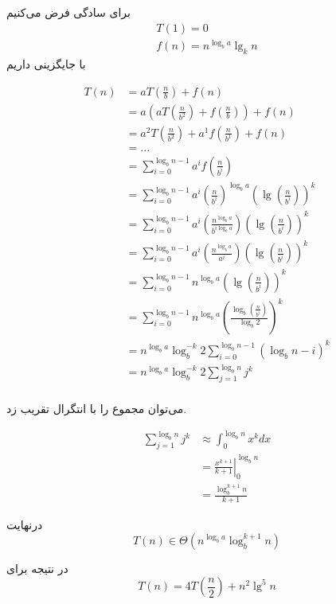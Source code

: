 \documentclass{article}
\begin{document}
	برای سادگی فرض می‌کنیم
	\begin{gather*}
		T(1) = 0 \\
		f(n) = n^{\log_b a} \lg_k n
	\end{gather*}
	با جایگزینی داریم

	\begin{align*}
		T(n) &= aT(\frac{n}{b}) + f(n) \\
		&= a(aT(\frac{n}{b^2}) + f(\frac{n}{b})) + f(n) \\
		&= a^2 T(\frac{n}{b^2}) + a^1f(\frac{n}{b^1}) + f(n) \\
		&= ... \\
		&= \sum_{i=0}^{\log_b n - 1} a^i f(\frac{n}{b^i}) \\
		&= \sum_{i=0}^{\log_b n - 1} a^i \left(\frac{n}{b^i}\right)^{\log_b a} \left(\lg \left(\frac{n}{b^i}\right)\right)^k \\
		&= \sum_{i=0}^{\log_b n - 1} a^i \left(\frac{n^{\log_b a}}{b^{i{\log_b a}}}\right) \left(\lg \left(\frac{n}{b^i}\right)\right)^k \\
		&= \sum_{i=0}^{\log_b n - 1} a^i \left(\frac{n^{\log_b a}}{a^i}\right) \left(\lg \left(\frac{n}{b^i}\right)\right)^k \\
		&= \sum_{i=0}^{\log_b n - 1}  n^{\log_b a} \left(\lg \left(\frac{n}{b^i}\right)\right)^k \\
		&= \sum_{i=0}^{\log_b n - 1}  n^{\log_b a} \left(\frac{\log_b \left(\frac{n}{b^i}\right)}{\log_b 2}\right)^k \\
		&= n^{\log_b a} \log_b^{-k} 2 \sum_{i=0}^{\log_b n - 1} \left(\log_b n - i\right)^k \\
		&= n^{\log_b a} \log_b^{-k} 2 \sum_{j=1}^{\log_b n} j^k \\
	\end{align*}

		می‌توان مجموع را با انتگرال تقریب زد.

	\begin{align*}
		\sum_{j=1}^{\log_b n} j^k
		&\approx \int_{0}^{\log_b n} x^k dx\\
		&= \left.\frac{x^{k+1}}{k+1}\right|^{\log_b n}_{0} \\
		&= \frac{\log^{k+1}_b n}{k+1}
	\end{align*}

	درنهایت
	\begin{equation*}
		T(n) \in \Theta(n^{\log_b a} \log_b^{k+1} n)
	\end{equation*}

	در نتیجه برای
	\begin{equation*}
		T(n) = 4T(\frac{n}{2}) + n^2 \lg^5 n
	\end{equation*}
\end{document}
